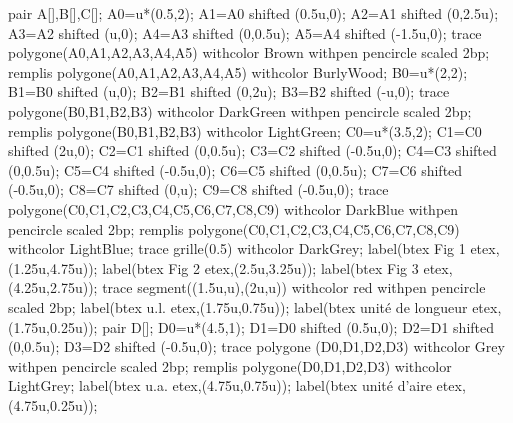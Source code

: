 \begin{remarques}
    \medskip
    \begin{minipage}{0.45\linewidth}
        \begin{Geometrie}[CoinHD={(6u,5.5u)}]            
            pair A[],B[],C[];
            A0=u*(0.5,2);
            A1=A0 shifted (0.5u,0);
            A2=A1 shifted (0,2.5u);
            A3=A2 shifted (u,0);
            A4=A3 shifted (0,0.5u);
            A5=A4 shifted (-1.5u,0);
            trace polygone(A0,A1,A2,A3,A4,A5) withcolor Brown withpen pencircle scaled 2bp;
            remplis polygone(A0,A1,A2,A3,A4,A5) withcolor BurlyWood;            
            B0=u*(2,2);
            B1=B0 shifted (u,0);
            B2=B1 shifted (0,2u);
            B3=B2 shifted (-u,0);
            trace polygone(B0,B1,B2,B3) withcolor DarkGreen withpen pencircle scaled 2bp;
            remplis polygone(B0,B1,B2,B3) withcolor LightGreen;            
            C0=u*(3.5,2);
            C1=C0 shifted (2u,0);
            C2=C1 shifted (0,0.5u);
            C3=C2 shifted (-0.5u,0);
            C4=C3 shifted (0,0.5u);
            C5=C4 shifted (-0.5u,0);
            C6=C5 shifted (0,0.5u);
            C7=C6 shifted (-0.5u,0);
            C8=C7 shifted (0,u);
            C9=C8 shifted (-0.5u,0);
            trace polygone(C0,C1,C2,C3,C4,C5,C6,C7,C8,C9) withcolor DarkBlue withpen pencircle scaled 2bp;
            remplis polygone(C0,C1,C2,C3,C4,C5,C6,C7,C8,C9) withcolor LightBlue;            
            trace grille(0.5) withcolor DarkGrey;
            label(btex {\color{Brown} Fig 1} etex,(1.25u,4.75u));
            label(btex {\color{DarkGreen} Fig 2} etex,(2.5u,3.25u));
            label(btex {\color{DarkBlue} Fig 3} etex,(4.25u,2.75u));
            trace segment((1.5u,u),(2u,u)) withcolor red withpen pencircle scaled 2bp;
            label(btex u.l. etex,(1.75u,0.75u));
            label(btex unité de longueur etex,(1.75u,0.25u));
            pair D[];
            D0=u*(4.5,1);
            D1=D0 shifted (0.5u,0);
            D2=D1 shifted (0,0.5u);
            D3=D2 shifted (-0.5u,0);            
            trace polygone (D0,D1,D2,D3) withcolor Grey withpen pencircle scaled 2bp;
            remplis polygone(D0,D1,D2,D3) withcolor LightGrey;
            label(btex u.a. etex,(4.75u,0.75u));
            label(btex unité d'aire etex,(4.75u,0.25u));
        \end{Geometrie}
    \end{minipage}
    \begin{minipage}{0.5\linewidth}

\end{minipage}
\end{remarques}
